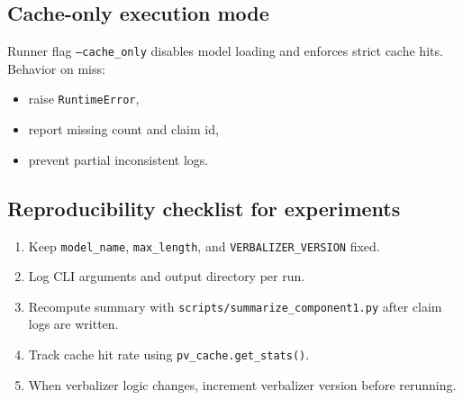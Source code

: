 \subsection{Cache-only execution mode}
Runner flag \texttt{--cache\_only} disables model loading and enforces strict cache hits.
Behavior on miss:
\begin{itemize}
\item raise \texttt{RuntimeError},
\item report missing count and claim id,
\item prevent partial inconsistent logs.
\end{itemize}

\subsection{Reproducibility checklist for experiments}
\begin{enumerate}
\item Keep \texttt{model\_name}, \texttt{max\_length}, and \texttt{VERBALIZER\_VERSION} fixed.
\item Log CLI arguments and output directory per run.
\item Recompute summary with \texttt{scripts/summarize\_component1.py} after claim logs are written.
\item Track cache hit rate using \texttt{pv\_cache.get\_stats()}.
\item When verbalizer logic changes, increment verbalizer version before rerunning.
\end{enumerate}
